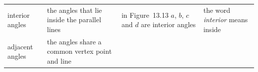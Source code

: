 \begin{table}[H]
\begin{center}
\begin{xtabular*}{\mytablewidth}[t]{|p{3cm}|p{3cm}|p{3cm}|p{20\mystarwidth}|}
        interior angles &
    
    
        the angles that lie inside the parallel lines &
    
    
        in Figure~13.13 \begin{math}a\end{math}, \begin{math}b\end{math}, \begin{math}c\end{math} and \begin{math}d\end{math} are interior angles &
    
    
        the word \textsl{interior} means inside%
     \tabularnewline{}
    
    
        adjacent angles &
    
    
        the angles share a common vertex point and line &
    
    

\end{xtabular*}
\end{center}
\end{table}
